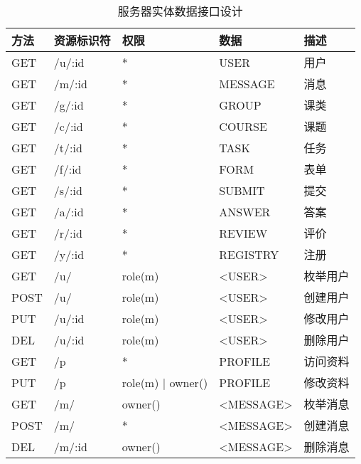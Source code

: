 \noindent
\ttfamily
\begin{longtable}{|p{1.2cm}|p{3cm}|p{3cm}|p{4cm}|X|}

  \caption{服务器实体数据接口设计}
  \\
  \hline

  \textbf{方法} & \textbf{资源标识符} & \textbf{权限} & \textbf{数据} & \textbf{描述} \\ \hline

  GET  & /u/:id            & *    & USER         & 用户 \\ \hline
  GET  & /m/:id            & *    & MESSAGE      & 消息 \\ \hline
  GET  & /g/:id            & *    & GROUP        & 课类 \\ \hline
  GET  & /c/:id            & *    & COURSE       & 课题 \\ \hline
  GET  & /t/:id            & *    & TASK         & 任务 \\ \hline
  GET  & /f/:id            & *    & FORM         & 表单 \\ \hline
  GET  & /s/:id            & *    & SUBMIT       & 提交 \\ \hline
  GET  & /a/:id            & *    & ANSWER       & 答案 \\ \hline
  GET  & /r/:id            & *    & REVIEW       & 评价 \\ \hline
  GET  & /y/:id            & *    & REGISTRY     & 注册 \\ \hline

  GET  & /u/    & role(m) & <USER> & 枚举用户 \\ \hline
  POST & /u/    & role(m) & <USER> & 创建用户 \\ \hline
  PUT  & /u/:id & role(m) & <USER> & 修改用户 \\ \hline
  DEL  & /u/:id & role(m) & <USER> & 删除用户 \\ \hline

  GET  & /p     & *                 & PROFILE & 访问资料 \\ \hline
  PUT  & /p     & role(m) | owner() & PROFILE & 修改资料 \\ \hline

  GET  & /m/    & owner() & <MESSAGE> & 枚举消息 \\ \hline
  POST & /m/    & *       & <MESSAGE> & 创建消息 \\ \hline
  DEL  & /m/:id & owner() & <MESSAGE> & 删除消息 \\ \hline


\end{longtable}
